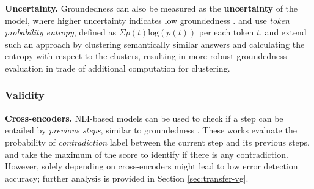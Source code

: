 
\textbf{Uncertainty.} \hspace{0.1cm} Groundedness can also be measured as the \textbf{uncertainty} of the model, where higher uncertainty indicates low groundedness \citep{xiao-wang-2021-hallucination, zhang-etal-2023-enhancing-uncertainty}. \citet{qiu2024entropybaseddecodingretrievalaugmentedlarge} and \citet{wu-etal-2024-synchronous} use \textit{token probability entropy}, defined as $\Sigma p(t)\textrm{log}(p(t))$ per each token $t$. \citet{farquhar2024detecting} and \citet{kossen2024semanticentropyprobesrobust} extend such an approach by clustering semantically similar answers and calculating the entropy with respect to the clusters, resulting in more robust groundedness evaluation in trade of additional computation for clustering.



\subsubsection{Validity}

\textbf{Cross-encoders.} \hspace{0.1cm} NLI-based models can be used to check if a step can be entailed by \textit{previous steps}, similar to groundedness \citep{DBLP:conf/iclr/GolovnevaCPCZFC23, prasad-etal-2023-receval, zhu2024deductivebeamsearchdecoding}. These works evaluate the probability of \textit{contradiction} label between the current step and its previous steps, and take the maximum of the score to identify if there is any contradiction. However, solely depending on cross-encoders might lead to low error detection accuracy; further analysis is provided in Section \ref{sec:transfer-vg}.


